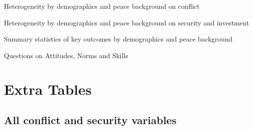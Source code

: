 \documentclass[10pt]{article}
\begin{document}
\begin{landscape}
\begin{table}[H]
\caption{Heterogeneity by demographics and peace background on conflict}
\begin{center}
\begin{adjustbox}{max width = 1.5\textheight}

\end{adjustbox}
\end{center}
\end{table}

\begin{table}[H]
\caption{Heterogeneity by demographics and peace background on security and investment}
\begin{center}
\begin{adjustbox}{max width = 1.5\textheight}

\end{adjustbox}
\end{center}
\end{table}


\begin{table}[H]
\caption{Summary statistics of key outcomes by demographics and peace background}
\begin{center}
\begin{adjustbox}{max width = 1.5\textheight}

\end{adjustbox}
\end{center}
\end{table}
\end{landscape}

\begin{table}[H]
\caption{Questions on Attitudes, Norms and Skills}
\begin{center}
\begin{adjustbox}{max width = 1.5\textheight}
\end{adjustbox}
\end{center}
\end{table}

\section{Extra Tables}
\clearpage
\setcounter{table}{0}   
\renewcommand{\thetable}{E.\arabic{table}}

\subsection{All conflict and security variables}
\end{document}
